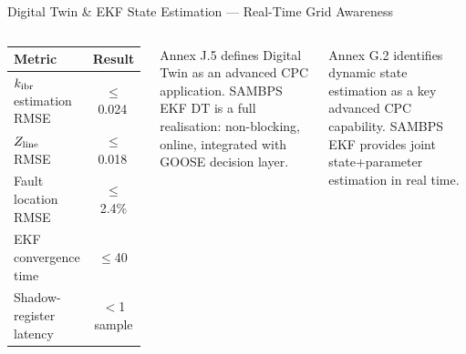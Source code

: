 \documentclass[aspectratio=169, 10pt]{beamer}
\newcommand{\pu}{\,\text{p.u.}}
\newcommand{\ms}{\,\text{ms}}
\newcommand{\kIBR}{k_{\rm ibr}}
\begin{document}
\begin{frame}{Digital Twin \& EKF State Estimation --- Real-Time Grid Awareness}
\begin{columns}[T]
\vspace{4pt}
\begin{tcolorbox}[resultbox, title={EKF Digital Twin Performance}]
{\footnotesize
\begin{tabular}{lc}
\toprule
\textbf{Metric} & \textbf{Result}\\
\midrule
$\kIBR$ estimation RMSE  & $\le$0.024\pu\\
$Z_{\rm line}$ RMSE      & $\le$0.018\pu\\
Fault location RMSE      & $\le$2.4\%\\
EKF convergence time     & $\le$40\ms\\
Shadow-register latency  & $<$1 sample\\
\bottomrule
\end{tabular}}
\end{tcolorbox}
\vspace{6pt}
\begin{tcolorbox}[cpcbox, title={CPC Link --- C37.300 Annex J.5}]
{\scriptsize Annex J.5 defines Digital Twin as an advanced
CPC application. SAMBPS EKF DT is a full realisation:
non-blocking, online, integrated with GOOSE decision layer.}
\end{tcolorbox}
\vspace{5pt}
\begin{tcolorbox}[cpcbox, title={CPC Link --- C37.300 Annex G.2}]
{\scriptsize Annex G.2 identifies dynamic state estimation
as a key advanced CPC capability. SAMBPS EKF provides joint
state+parameter estimation in real time.}
\end{tcolorbox}
\end{columns}
\end{frame}
\end{document}
